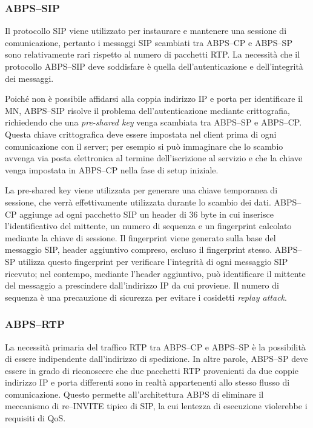 \documentclass[12pt,a4paper,openright,twoside,draft]{book}
\begin{document}
\subsubsection{ABPS--SIP}

Il protocollo SIP viene utilizzato per instaurare e mantenere una
sessione di comunicazione, pertanto i messaggi SIP scambiati tra
ABPS--CP e ABPS--SP sono relativamente rari rispetto al numero di
pacchetti RTP. La necessità che il protocollo ABPS--SIP deve
soddisfare è quella dell'autenticazione e dell'integrità dei
messaggi.

Poiché non è possibile affidarsi alla coppia indirizzo IP e porta per
identificare il MN, ABPS--SIP risolve il problema dell'autenticazione
mediante crittografia, richiedendo che una \emph{pre-shared key} venga
scambiata tra ABPS--SP e ABPS--CP. Questa chiave crittografica deve
essere impostata nel client prima di ogni comunicazione con il server;
per esempio si può immaginare che lo scambio avvenga via posta
elettronica al termine dell'iscrizione al servizio e che la chiave
venga impostata in ABPS--CP nella fase di setup iniziale.

La pre-shared key viene utilizzata per generare una chiave temporanea
di sessione, che verrà effettivamente utilizzata durante lo scambio
dei dati. ABPS--CP aggiunge ad ogni pacchetto SIP un header di 36 byte
in cui inserisce l'identificativo del mittente, un numero di sequenza
e un fingerprint calcolato mediante la chiave di sessione. Il
fingerprint viene generato sulla base del messaggio SIP, header
aggiuntivo compreso, escluso il fingerprint stesso. ABPS--SP utilizza
questo fingerprint per verificare l'integrità di ogni messaggio SIP
ricevuto; nel contempo, mediante l'header aggiuntivo, può identificare
il mittente del messaggio a prescindere dall'indirizzo IP da cui
proviene. Il numero di sequenza è una precauzione di sicurezza per
evitare i cosidetti \emph{replay attack}.

\subsubsection{ABPS--RTP}

La necessità primaria del traffico RTP tra ABPS--CP e ABPS--SP è la
possibilità di essere indipendente dall'indirizzo di spedizione. In
altre parole, ABPS--SP deve essere in grado di riconoscere che due
pacchetti RTP provenienti da due coppie indirizzo IP e porta
differenti sono in realtà appartenenti allo stesso flusso di
comunicazione. Questo permette all'architettura ABPS di eliminare il
meccanismo di re--INVITE tipico di SIP, la cui lentezza di esecuzione
violerebbe i requisiti di QoS.
\end{document}
